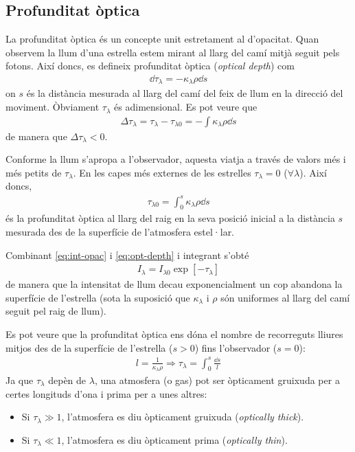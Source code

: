\subsection{Profunditat òptica}
La profunditat òptica és un concepte unit estretament al d'opacitat. Quan observem la llum d'una estrella estem mirant al llarg del camí mitjà seguit pels fotons. Així doncs, es defineix profunditat òptica (\textit{optical depth}) com
\begin{align}\label{eq:opt-depth}
	\dd{\tau}_{\lambda} = - \kappa_{\lambda} \rho \dd{s}
\end{align}
on $s$ és la distància mesurada al llarg del camí del feix de llum en la direcció del moviment. Òbviament $\tau_{\lambda}$ és adimensional. Es pot veure que
\begin{align*}
	\Delta \tau_{\lambda} = \tau_{\lambda} - \tau_{\lambda 0} = - \int \kappa_{\lambda} \rho \dd{s}
\end{align*}
de manera que $\Delta \tau_{\lambda} < 0$.

Conforme la llum s'apropa a l'observador, aquesta viatja a través de valors més i més petits de $\tau_{\lambda}$. En les capes més externes de les estrelles $\tau_{\lambda} = 0$ ($\forall \lambda$). Així doncs,
\begin{align}
	\tau_{\lambda 0} = \int_{0}^{s} \kappa_{\lambda} \rho \dd{s}
\end{align}
és la profunditat òptica al llarg del raig en la seva posició inicial a la distància $s$ mesurada des de la superfície de l'atmosfera estel·lar.

Combinant \eqref{eq:int-opac} i \eqref{eq:opt-depth} i integrant s'obté
\begin{align}\label{eq:itau}
	I_{\lambda} = I_{\lambda 0} \exp[-\tau_{\lambda}]
\end{align}
de manera que la intensitat de llum decau exponencialment un cop abandona la superfície de l'estrella (sota la suposició que $\kappa_{\lambda}$ i $\rho$ són uniformes al llarg del camí seguit pel raig de llum).

Es pot veure que la profunditat òptica ens dóna el nombre de recorreguts lliures mitjos des de la superfície de l'estrella ($s > 0$) fins l'observador ($s = 0$):
\begin{align}
	l = \frac{1}{\kappa_{\lambda} \rho} \Rightarrow \tau_{\lambda} = \int_{0}^{s} \frac{\dd{s}}{l}
\end{align}
Ja que $\tau_{\lambda}$ depèn de $\lambda$, una atmosfera (o gas) pot ser òpticament gruixuda per a certes longituds d'ona i prima per a unes altres:
\begin{itemize}
	\item Si $\tau_{\lambda} \gg 1$, l'atmosfera es diu òpticament gruixuda (\textit{optically thick}).
	\item Si $\tau_{\lambda} \ll 1$, l'atmosfera es diu òpticament prima (\textit{optically thin}).
\end{itemize}

